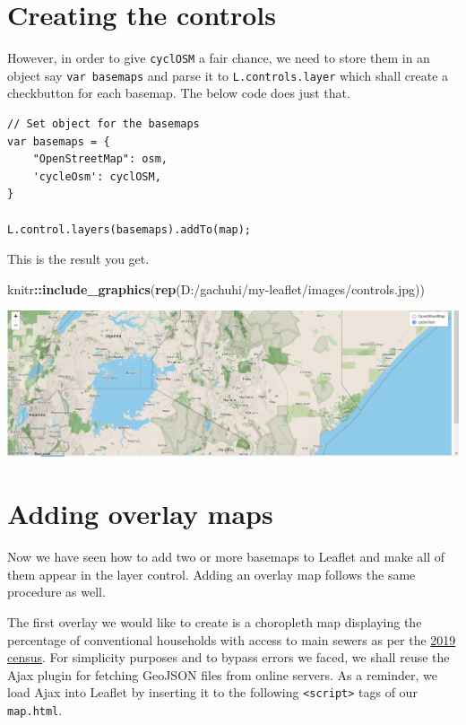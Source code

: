 \documentclass[
]{book}
\newenvironment{Shaded}{\begin{snugshade}}{\end{snugshade}}
\newcommand{\FunctionTok}[1]{\textcolor[rgb]{0.13,0.29,0.53}{\textbf{#1}}}
\newcommand{\NormalTok}[1]{#1}
\newcommand{\SpecialCharTok}[1]{\textcolor[rgb]{0.81,0.36,0.00}{\textbf{#1}}}
\newcommand{\StringTok}[1]{\textcolor[rgb]{0.31,0.60,0.02}{#1}}
\begin{document}
\hypertarget{creating-the-controls}{%
\section{Creating the controls}\label{creating-the-controls}}

However, in order to give \texttt{cyclOSM} a fair chance, we need to store them in an object say \texttt{var\ basemaps} and parse it to \texttt{L.controls.layer} which shall create a checkbutton for each basemap. The below code does just that.

\begin{verbatim}
// Set object for the basemaps
var basemaps = {
    "OpenStreetMap": osm,
    'cycleOsm': cyclOSM,
}

L.control.layers(basemaps).addTo(map);

\end{verbatim}

This is the result you get.

\begin{Shaded}
\begin{Highlighting}[]
\NormalTok{knitr}\SpecialCharTok{::}\FunctionTok{include\_graphics}\NormalTok{(}\FunctionTok{rep}\NormalTok{(}\StringTok{\textquotesingle{}D:/gachuhi/my{-}leaflet/images/controls.jpg\textquotesingle{}}\NormalTok{))}
\end{Highlighting}
\end{Shaded}

\includegraphics{../images/controls.jpg}

\hypertarget{adding-overlay-maps}{%
\section{Adding overlay maps}\label{adding-overlay-maps}}

Now we have seen how to add two or more basemaps to Leaflet and make all of them appear in the layer control. Adding an overlay map follows the same procedure as well.

The first overlay we would like to create is a choropleth map displaying the percentage of conventional households with access to main sewers as per the \href{https://housingfinanceafrica.org/app/uploads/VOLUME-IV-KPHC-2019.pdf}{2019 census}. For simplicity purposes and to bypass errors we faced, we shall reuse the Ajax plugin for fetching GeoJSON files from online servers. As a reminder, we load Ajax into Leaflet by inserting it to the following \texttt{\textless{}script\textgreater{}} tags of our \texttt{map.html}.
\end{document}
